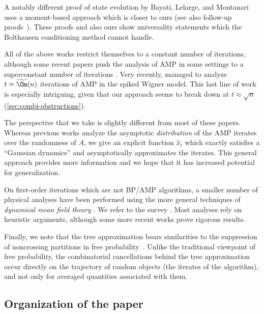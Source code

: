 \documentclass[12pt]{article}
\begin{document}
A notably different proof of state evolution by Bayati, Lelarge, and Montanari \cite{bayati2015universality} uses a moment-based approach
which is closer to ours
(see also follow-up proofs~\cite{chen2021universality, dembo2021diffusions, wang2022universality, dudeja2023universality}).
These proofs and also ours show universality statements which the Bolthausen conditioning method cannot handle.


All of the above works restrict themselves to a constant number of
iterations,
although some recent papers push the analysis of AMP in some settings to a superconstant number of iterations 
\cite{rush2018finite, cademartori2023non, wu2023lower,wu2024sharp}.
Very recently, \cite{LW22, LFW23} managed to analyze $t = \widetilde{\Om}(n)$ iterations of AMP in the spiked Wigner model.
This last line of work is especially intriguing, given that our
approach seems to break down at $t \approx \sqrt{n}$ (\cref{sec:combi-obstructions}).


The perspective that we take is slightly different from most of these papers.
Whereas previous works analyze the asymptotic \emph{distribution} of the AMP iterates over the randomness of $A$,
we give an explicit function $\widehat x_t$ which exactly satisfies a ``Gaussian dynamics'' and asymptotically approximates the iterates.
This general approach provides more information and we hope that it has increased potential
for generalization.

On first-order iterations which are not BP/AMP algorithms, a smaller number of physical analyses have
been performed using the more general techniques of \emph{dynamical mean field theory} \cite{martin1973statistical}.
We refer to the survey \cite{gabrie2020mean}.
Most analyses rely on heuristic arguments, although some more recent works \cite{celentano2021high, gerbelot2022rigorous, liang2022high} prove rigorous results.

Finally, we note that the tree approximation
bears similarities to the suppression of
noncrossing partitions in free probability~\cite{speicherBook}.
Unlike the traditional viewpoint of free
probability, the combinatorial cancellations
behind the tree approximation
occur directly on the trajectory of 
random objects (the
iterates of the algorithm), and
not only for averaged quantities associated with them.



\subsection{Organization of the paper}
\end{document}
